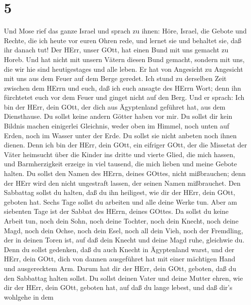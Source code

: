 \hypertarget{section-4}{%
\section{5}\label{section-4}}

 Und Mose rief das ganze Israel und sprach zu ihnen: Höre,
Israel, die Gebote und Rechte, die ich heute vor euren Ohren rede, und
lernet sie und behaltet sie, daß ihr danach tut!  Der HErr,
unser GOtt, hat einen Bund mit uns gemacht zu Horeb.  Und
hat nicht mit unsern Vätern diesen Bund gemacht, sondern mit uns, die
wir hie sind heutigestages und alle leben.  Er hat von
Angesicht zu Angesicht mit uns aus dem Feuer auf dem Berge geredet.
 Ich stund zu derselben Zeit zwischen dem HErrn und euch,
daß ich euch ansagte des HErrn Wort; denn ihn fürchtetet euch vor dem
Feuer und ginget nicht auf den Berg. Und er sprach:  Ich bin
der HErr, dein GOtt, der dich aus Ägyptenland geführet hat, aus dem
Diensthause.  Du sollst keine andern Götter haben vor mir.
 Du sollst dir kein Bildnis machen einigerlei Gleichnis,
weder oben im Himmel, noch unten auf Erden, noch im Wasser unter der
Erde.  Du sollst sie nicht anbeten noch ihnen dienen. Denn
ich bin der HErr, dein GOtt, ein eifriger GOtt, der die Missetat der
Väter heimsucht über die Kinder ins dritte und vierte Glied, die mich
hassen,  und Barmherzigkeit erzeige in viel tausend, die
mich lieben und meine Gebote halten.  Du sollst den Namen
des HErrn, deines GOttes, nicht mißbrauchen; denn der HErr wird den
nicht ungestraft lassen, der seinen Namen mißbrauchet.  Den
Sabbattag sollst du halten, daß du ihn heiligest, wie dir der HErr, dein
GOtt, geboten hat.  Sechs Tage sollst du arbeiten und alle
deine Werke tun.  Aber am siebenten Tage ist der Sabbat des
HErrn, deines GOttes. Da sollst du keine Arbeit tun, noch dein Sohn,
noch deine Tochter, noch dein Knecht, noch deine Magd, noch dein Ochse,
noch dein Esel, noch all dein Vieh, noch der Fremdling, der in deinen
Toren ist, auf daß dein Knecht und deine Magd ruhe, gleichwie du.
 Denn du sollst gedenken, daß du auch Knecht in Ägyptenland
warst, und der HErr, dein GOtt, dich von dannen ausgeführet hat mit
einer mächtigen Hand und ausgerecktem Arm. Darum hat dir der HErr, dein
GOtt, geboten, daß du den Sabbattag halten sollst.  Du
sollst deinen Vater und deine Mutter ehren, wie dir der HErr, dein GOtt,
geboten hat, auf daß du lange lebest, und daß dir's wohlgehe in dem
